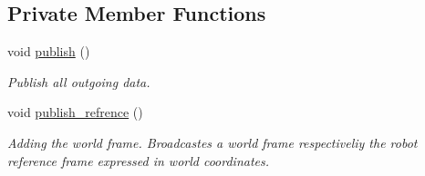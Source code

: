 \subsection*{Private Member Functions}
\begin{DoxyCompactItemize}
\item 
void \hyperlink{classController_ae6859e3a43be2fa31cb82ace3954e746}{publish} ()\hypertarget{classController_ae6859e3a43be2fa31cb82ace3954e746}{}\label{classController_ae6859e3a43be2fa31cb82ace3954e746}

\begin{DoxyCompactList}\small\item\em Publish all outgoing data. \end{DoxyCompactList}\item 
void \hyperlink{classController_a8509c67c73d26e981ef0972f44dc73ca}{publish\+\_\+refrence} ()\hypertarget{classController_a8509c67c73d26e981ef0972f44dc73ca}{}\label{classController_a8509c67c73d26e981ef0972f44dc73ca}

\begin{DoxyCompactList}\small\item\em Adding the world frame. Broadcastes a world frame respectiveliy the robot reference frame expressed in world coordinates. \end{DoxyCompactList}\end{DoxyCompactItemize}
